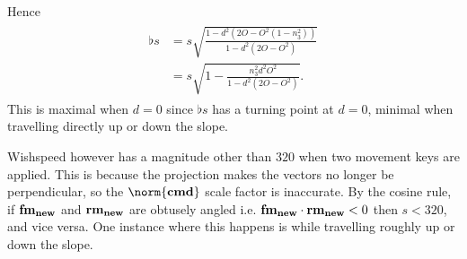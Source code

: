 Hence
\begin{gather}
\begin{aligned}
\label{eq:slope_fm_flat_s}
\flat{s} &= s \sqrt{\frac{1 - d^2 \left(2O - O^2 \left(1 - n_3^2 \right) \right)}{1 - d^2 \left(2O - O^2 \right)}}\\
&= s \sqrt{1 - \frac{n_3^2 d^2 O^2}{1 - d^2 \left(2O - O^2 \right)}}.
\end{aligned}
\end{gather}
This is maximal when $d = 0$ since $\flat{s}$ has a turning point at $d = 0$, minimal when travelling directly up or down the slope.

Wishspeed however has a magnitude other than $320$ when two movement keys are applied. This is because the projection makes the vectors no longer be perpendicular, so the $\norm{\tvec{\cmd}}$ scale factor is inaccurate. By the cosine rule, if $\boldsymbol{\operatorname{fm}_{\operatorname{new}}}$ and $\boldsymbol{\operatorname{rm}_{\operatorname{new}}}$ are obtusely angled i.e. $\boldsymbol{\operatorname{fm}_{\operatorname{new}}}\cdot \boldsymbol{\operatorname{rm}_{\operatorname{new}}} < 0$ then $s < 320$, and vice versa. One instance where this happens is while travelling roughly up or down the slope.

